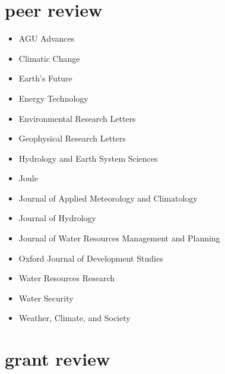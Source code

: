 \documentclass[10pt,oneside]{article}
\begin{document}

\section{peer review}

\mbox{}\vspace{-\dimexpr\baselineskip\relax}

\begin{itemize}[label={}]
  
    \item AGU Advances
  
    \item Climatic Change
  
    \item Earth's Future
  
    \item Energy Technology
  
    \item Environmental Research Letters
  
    \item Geophysical Research Letters
  
    \item Hydrology and Earth System Sciences
  
    \item Joule
  
    \item Journal of Applied Meteorology and Climatology
  
    \item Journal of Hydrology
  
    \item Journal of Water Resources Management and Planning
  
    \item Oxford Journal of Development Studies
  
    \item Water Resources Research
  
    \item Water Security
  
    \item Weather, Climate, and Society
  
\end{itemize}


\section{grant review}
\end{document}
